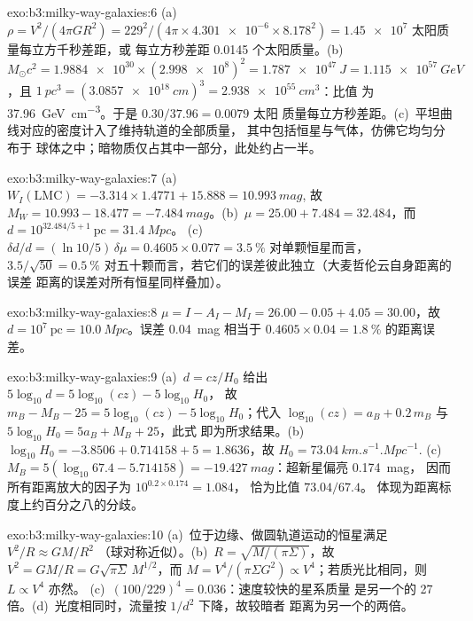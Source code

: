 \begin{solution}{exo:b3:milky-way-galaxies:6}
(a)~$\rho = V^2/(4\pi GR^2) = 229^2/(4\pi\times\num{4.301e-6}\times
8.178^2) = \num{1.45e7}$ 太阳质量每立方千秒差距，或
每立方秒差距 \num{0.0145} 个太阳质量。(b)~$M_\odot c^2 = \num{1.9884e30}\times
(\num{2.998e8})^2 = \qty{1.787e47}{J} = \qty{1.115e57}{GeV}$，且
$\qty{1}{pc^3} = (\qty{3.0857e18}{cm})^3 = \qty{2.938e55}{cm^3}$：比值
为 \qty{37.96}{GeV.cm^{-3}}。于是 $0.30/37.96 = \num{0.0079}$ 太阳
质量每立方秒差距。(c)~平坦曲线对应的密度计入了维持轨道的全部质量，
其中包括恒星与气体，仿佛它均匀分布于
球体之中；暗物质仅占其中一部分，此处约占一半。
\end{solution}

\begin{solution}{exo:b3:milky-way-galaxies:7}
(a)~$W_I(\mathrm{LMC}) = -3.314\times1.4771 + 15.888 = \qty{10.993}{mag}$,
故 $M_W = 10.993 - 18.477 = \qty{-7.484}{mag}$。(b)~$\mu = 25.00 + 7.484 =
32.484$，而 $d = 10^{32.484/5 + 1}~\mathrm{pc} = \qty{31.4}{Mpc}$。
(c)~$\delta d/d = (\ln 10/5)\,\delta\mu = 0.4605\times0.077 =
\qty{3.5}{\percent}$ 对单颗恒星而言，$3.5/\sqrt{50} = \qty{0.5}{\percent}$
对五十颗而言，若它们的误差彼此独立（大麦哲伦云自身距离的误差
距离的误差对所有恒星同样叠加）。
\end{solution}

\begin{solution}{exo:b3:milky-way-galaxies:8}
$\mu = I - A_I - M_I = 26.00 - 0.05 + 4.05 = 30.00$，故 $d =
10^{7}~\mathrm{pc} = \qty{10.0}{Mpc}$。误差 \qty{0.04}{mag} 相当于
$0.4605\times0.04 = \qty{1.8}{\percent}$ 的距离误差。
\end{solution}

\begin{solution}{exo:b3:milky-way-galaxies:9}
(a)~$d = cz/H_0$ 给出 $5\log_{10}d = 5\log_{10}(cz) - 5\log_{10}H_0$，
故 $m_B - M_B - 25 = 5\log_{10}(cz) - 5\log_{10}H_0$；代入
$\log_{10}(cz) = a_B + 0.2\,m_B$ 与 $5\log_{10}H_0 = 5a_B + M_B + 25$，此式
即为所求结果。(b)~$\log_{10}H_0 = -3.8506 + 0.714158 + 5 = 1.8636$，故
$H_0 = \qty{73.04}{km.s^{-1}.Mpc^{-1}}$. (c)~$M_B = 5(\log_{10}67.4 -
5.714158) = \qty{-19.427}{mag}$：超新星偏亮 \qty{0.174}{mag}，
因而所有距离放大的因子为 $10^{0.2\times0.174} = 1.084$，
恰为比值 $73.04/67.4$。
体现为距离标度上约百分之八的分歧。
\end{solution}

\begin{solution}{exo:b3:milky-way-galaxies:10}
(a)~位于边缘、做圆轨道运动的恒星满足 $V^2/R \approx GM/R^2$
（球对称近似）。(b)~$R = \sqrt{M/(\pi\Sigma)}$，故 $V^2 =
GM/R = G\sqrt{\pi\Sigma}\,M^{1/2}$，而 $M = V^4/(\pi\Sigma G^2) \propto
V^4$；若质光比相同，则 $L \propto V^4$ 亦然。
(c)~$(100/229)^4 = \num{0.036}$：速度较快的星系质量
是另一个的 27 倍。(d)~光度相同时，流量按 $1/d^2$ 下降，故较暗者
距离为另一个的两倍。
\end{solution}

